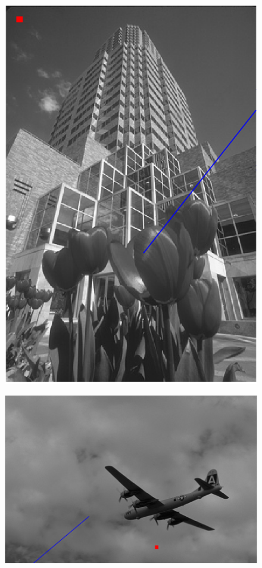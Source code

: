 \documentclass{article}
\begin{document}
\begin{figure}[h]
\centering
  \includegraphics[scale=0.5]{../prob1a.png}
\end{figure}

\begin{figure}[h]
\centering
  \includegraphics[scale=0.5]{../prob1b.png}
\end{figure}
\end{document}
